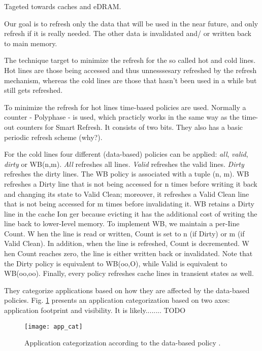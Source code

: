 Tageted towards caches and eDRAM.

Our goal is to refresh only the data that will be used in the near future, and only refresh if it is really needed. The other data is invalidated and/ or written back to main memory.

The technique target to minimize the refresh for the so called hot and cold lines. Hot lines are those being accessed and thus unnesssesary refreshed by the refresh mechanism, whereas the cold lines are those that hasn't been used in a while but still gets refreshed.

To minimize the refresh for hot lines time-based policies are used. Normally a counter - Polyphase - is used, which practicly works in the same way as the time-out counters for Smart Refresh. It consists of two bits. They also has a basic periodic refresh scheme (why?).

For the cold lines four different (data-based) policies can be applied: \textit{all}, \textit{valid}, \textit{dirty} or WB(n,m). \textit{All} refreshes all lines. \textit{Valid} refreshes the valid lines. \textit{Dirty} refreshes the dirty lines. The WB policy is associated with a tuple (n, m). WB refreshes a Dirty line that is not being accessed for n times before writing it back and changing its state to Valid Clean; moreover, it refreshes a Valid Clean line that is not being accessed for m times before invalidating it. WB retains a Dirty line in the cache Ion ger because evicting it has the additional cost of writing the line back to lower-Ievel memory. To implement WB, we maintain a per-Iine Count. W hen the line is read or written, Count is set to n (if Dirty) or m (if Valid Clean). In addition, when the line is refreshed, Count is decremented. W hen Count reaches zero, the line is either written back or invalidated. Note that the Dirty policy is equivalent to WB(oo,O), while Valid is equivalent to WB(oo,oo). Finally, every policy refreshes cache lines in transient states as well.

They categorize applications based on how they are affected by the data-based policies. Fig. \ref{fig:app_cat} presents an application categorization based on two axes: application footprint and visibility. It is likely........ TODO

\begin{figure}[t!]
	\texttt{[image: app\_cat]}
	\caption{Application categorization according to the data-based policy \cite{refrint}.}
	\label{fig:app_cat}
\end{figure}

